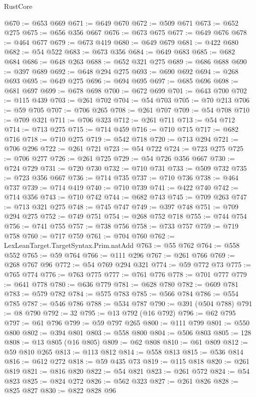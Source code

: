 \begin{lexlean}{RustCore}
\begin{coremodule}
@670 := @653 @669
@671 := @649 @670
@672 := @509 @671
@673 := @652 @275
@675 := @656 @356 @667
@676 := @673 @675
@677 := @649 @676
@678 := @464 @677
@679 := @673 @419
@680 := @649 @679
@681 := @422 @680
@682 := @54 @522
@683 := @673 @356
@684 := @649 @683
@685 := @682 @684
@686 := @648 @263
@688 := @652 @321 @275
@689 := @686 @688
@690 := @397 @689
@692 := @648 @294 @275
@693 := @690 @692
@694 := @268 @693
@695 := @649 @275
@696 := @694 @695
@697 := @685 @696
@698 := @681 @697
@699 := @678 @698
@700 := @672 @699
@701 := @643 @700
@702 := @115 @439
@703 := @261 @702
@704 := @54 @703
@705 := @70 @213
@706 := @59 @705
@707 := @706 @265
@708 := @261 @707
@709 := @54 @708
@710 := @709 @321
@711 := @706 @323
@712 := @261 @711
@713 := @54 @712
@714 := @713 @275
@715 := @714 @459
@716 := @710 @715
@717 := @682 @716
@718 := @710 @275
@719 := @542 @718
@720 := @713 @294
@721 := @706 @296
@722 := @261 @721
@723 := @54 @722
@724 := @723 @275
@725 := @706 @277
@726 := @261 @725
@729 := @54 @726 @356 @667
@730 := @724 @729
@731 := @720 @730
@732 := @710 @731
@733 := @509 @732
@735 := @723 @356 @667
@736 := @714 @735
@737 := @710 @736
@738 := @464 @737
@739 := @714 @419
@740 := @710 @739
@741 := @422 @740
@742 := @714 @356
@743 := @710 @742
@744 := @682 @743
@745 := @709 @263
@747 := @713 @321 @275
@748 := @745 @747
@749 := @397 @748
@751 := @709 @294 @275
@752 := @749 @751
@754 := @268 @752 @718
@755 := @744 @754
@756 := @741 @755
@757 := @738 @756
@758 := @733 @757
@759 := @719 @758
@760 := @717 @759
@761 := @704 @760
@762 := LexLeanTarget.TargetSyntax.Prim.natAdd
@763 := @55 @762
@764 := @558 @552
@765 := @59 @764
@766 := @111 @296
@767 := @261 @766
@769 := @268 @767 @96
@772 := @54 @769 @294 @321
@774 := @59 @772 @73
@775 := @765 @774
@776 := @763 @775
@777 := @761 @776
@778 := @701 @777
@779 := @641 @778
@780 := @636 @779
@781 := @628 @780
@782 := @609 @781
@783 := @579 @782
@784 := @575 @783
@785 := @566 @784
@786 := @554 @785
@787 := @546 @786
@788 := @534 @787
@790 := @391 (@504 @788)
@791 := @8 @790
@792 := 32
@795 := @13 @792 (@16 @792)
@796 := @62 @795
@797 := @61 @796
@799 := @59 @797 @265
@800 := @111 @799
@801 := @550 @800
@802 := @394 @801
@803 := @558 @800
@804 := @506 @803
@805 := 128
@808 := @13 @805 (@16 @805)
@809 := @62 @808
@810 := @61 @809
@812 := @59 @810 @265
@813 := @113 @812
@814 := @558 @813
@815 := @536 @814
@816 := @612 @272
@818 := @59 @435 @73
@819 := @115 @818
@820 := @261 @819
@821 := @816 @820
@822 := @54 @821
@823 := @261 @572
@824 := @54 @823
@825 := @824 @272
@826 := @562 @323
@827 := @261 @826
@828 := @825 @827
@830 := @822 @828 @96

\end{coremodule}
\end{lexlean}
